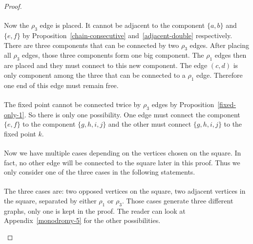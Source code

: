 \begin{proof}
\paragraph{}
Now the $\rho_3$ edge is placed. It cannot be adjacent to the component $\{a,b\}$ and $\{e,f\}$ by Proposition~\ref{chain-consecutive} and~\ref{adjacent-double} respectively. There are three components that can be connected by two $\rho_3$ edges. After placing all $\rho_3$ edges, those three components form one big component. The $\rho_1$ edges then are placed and they must connect to this new component. The edge $(c,d)$ is only component among the three that can be connected to a $\rho_1$ edge. Therefore one end of this edge must remain free.

\paragraph{}
The fixed point cannot be connected twice by $\rho_3$ edges by Proposition~\ref{fixed-only-1}. So there is only one possibility. One edge must connect the component $\{e,f\}$ to the component $\{g,h,i,j\}$ and the other must connect $\{g,h,i,j\}$ to the fixed point $k$.

\paragraph{}
Now we have multiple cases depending on the vertices chosen on the square. In fact, no other edge will be connected to the square later in this proof. Thus we only consider one of the three cases in the following statements.

\paragraph{}
The three cases are: two opposed vertices on the square, two adjacent vertices in the square, separated by either $\rho_1$ or $\rho_3$. Those cases generate three different graphs, only one is kept in the proof. The reader can look at Appendix~\ref{monodromy-5} for the other possibilities.

\begin{figure}[H]
  \begin{center}
\end{center}
\end{figure}
\end{proof}
